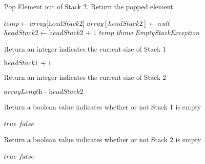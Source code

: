 \documentclass[16pt, letterpaper]{article}
\begin{document}
\begin{algorithm} [H]
\caption{Pop Element out of Stack 2. Return the popped element}
\begin{algorithmic}[1]
        \State $temp \gets \textit{array[headStack2]}$
        \State $array[headStack2] \gets \textit{null}$
        \State $headStack2 \gets \textit{headStack2 + 1}$
        \State \Return $temp$
    \Else
        \State \textit{throw EmptyStackException}
    \EndIf
    \EndProcedure
\end{algorithmic}
\end{algorithm}

\begin{algorithm} [H]
\caption{Return an integer indicates the current size of Stack 1}
\begin{algorithmic}
    \State \Return $\textit{headStack1 + 1}$
    \EndProcedure
\end{algorithmic}
\end{algorithm}

\begin{algorithm} [H]
\caption{Return an integer indicates the current size of Stack 2}
\begin{algorithmic}
    \State \Return $\textit{arrayLength - headStack2}$
    \EndProcedure
\end{algorithmic}
\end{algorithm}

\begin{algorithm} [H]
\caption{Return a boolean value indicates whether or not Stack 1 is empty}
\begin{algorithmic}
    \State \Return $\textit{true}$
    \Else
    \State \Return $\textit{false}$
    \EndIf
    \EndProcedure
\end{algorithmic}
\end{algorithm}

\begin{algorithm} [H]
\caption{Return a boolean value indicates whether or not Stack 2 is empty}
\begin{algorithmic}
    \State \Return $\textit{true}$
    \Else
    \State \Return $\textit{false}$
    \EndIf
    \EndProcedure
\end{algorithmic}
\end{algorithm}
\end{document}
